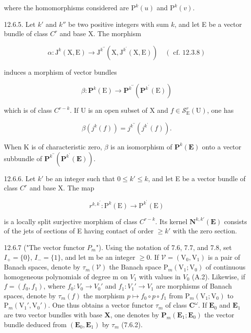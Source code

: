 where the homomorphisms considered are \(\mathrm{P}^{k}(u)\) and \(\mathrm{P}^{k}(v)\).

12.6.5. Let \(k'\) and \(k''\) be two positive integers with sum \(k\), and let E be a vector bundle of class \(C^{r}\) and base X. The morphism

\[
\alpha \colon \mathrm{J} ^ {k} (\mathrm{X}, \mathrm{E}) \rightarrow \mathrm{J} ^ {k ^ {\prime \prime}} (\mathrm{X}, \mathrm{J} ^ {k ^ {\prime}} (\mathrm{X}, \mathrm{E})) \quad (\text { cf. } 1 2. 3. 8)
\]

induces a morphism of vector bundles

\[
\beta \colon \mathbf {P} ^ {k} (\mathrm{E}) \rightarrow \mathbf {P} ^ {k ^ {\prime \prime}} (\mathbf {P} ^ {k ^ {\prime}} (\mathrm{E}))
\]

which is of class \(C^{r-k}\). If U is an open subset of X and \(f\in\mathcal{S}_{\mathrm{E}}^{r}(\mathrm{U})\), one has

\[
\beta (j ^ {k} (f)) = j ^ {k ^ {\prime \prime}} (j ^ {k ^ {\prime}} (f)).
\]

When K is of characteristic zero, \(\beta\) is an isomorphism of \(\mathbf{P}^{k}(\mathbf{E})\) onto a vector subbundle of \(\mathbf{P}^{k^{\prime\prime}}(\mathbf{P}^{k^{\prime}}(\mathbf{E}))\).

12.6.6. Let \(k'\) be an integer such that \(0 \leqslant k' \leqslant k\), and let E be a vector bundle of class \(C^r\) and base X. The map

\[
r ^ {k, k ^ {\prime}}: \mathrm{P} ^ {k} (\mathrm{E}) \rightarrow \mathrm{P} ^ {k ^ {\prime}} (\mathrm{E})
\]

is a locally split surjective morphism of class \(C^{r-k}\). Its kernel \(\mathbf{N}^{k,k'}(\mathbf{E})\) consists of the jets of sections of E having contact of order \(\geqslant k'\) with the zero section.

12.6.7 ("The vector functor \(P_{m}\)"). Using the notation of 7.6, 7.7, and 7.8, set \(I_{+} = \{0\}\), \(I_{-} = \{1\}\), and let m be an integer \(\geqslant 0\). If \(\mathcal{V} = (\mathrm{V}_{0}, \mathrm{V}_{1})\) is a pair of Banach spaces, denote by \(\tau_{m}(\mathcal{V})\) the Banach space \(\mathrm{P}_{m}(\mathrm{V}_{1}; \mathrm{V}_{0})\) of continuous homogeneous polynomials of degree m on \(V_{1}\) with values in \(V_{0}\) (A.2). Likewise, if \(f = (f_{0}, f_{1})\), where \(f_{0}: V_{0} \to V_{0}'\) and \(f_{1}: V_{1}' \to V_{1}\) are morphisms of Banach spaces, denote by \(\tau_{m}(f)\) the morphism \(p \mapsto f_{0} \circ p \circ f_{1}\) from \(\mathrm{P}_{m}(\mathrm{V}_{1}; \mathrm{V}_{0})\) to \(\mathrm{P}_{m}(\mathrm{V}_{1}', \mathrm{V}_{0}')\). One thus obtains a vector functor \(\tau_{m}\) of class \(\mathbf{C}^{\omega}\). If \(\mathbf{E}_{0}\) and \(\mathbf{E}_{1}\) are two vector bundles with base \(\mathbf{X}\), one denotes by \(\mathbf{P}_{m}(\mathbf{E}_{1};\mathbf{E}_{0})\) the vector bundle deduced from \((\mathbf{E}_{0},\mathbf{E}_{1})\) by \(\tau_{m}\) (7.6.2).

